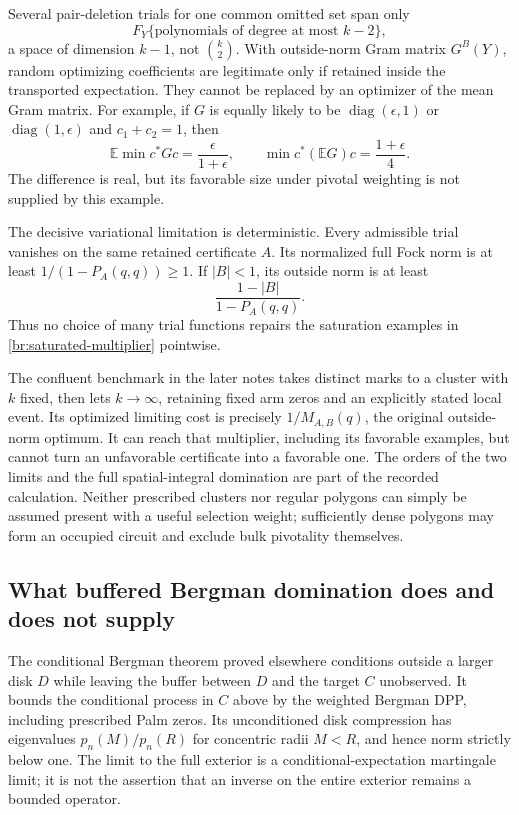 \documentclass[11pt,a4paper]{article}
\theoremstyle{definition}
\theoremstyle{remark}
\numberwithin{equation}{section}
\begin{document}
Several pair-deletion trials for one common omitted set span only
\[
 F_Y\{\text{polynomials of degree at most }k-2\},
\]
a space of dimension $k-1$, not $\binom{k}{2}$.  With outside-norm
Gram matrix $G^B(Y)$, random optimizing coefficients are legitimate
only if retained inside the transported expectation.  They cannot be
replaced by an optimizer of the mean Gram matrix.  For example, if
$G$ is equally likely to be
$\operatorname{diag}(\epsilon,1)$ or
$\operatorname{diag}(1,\epsilon)$ and $c_1+c_2=1$, then
\[
 \mathbb E\min c^*Gc=\frac{\epsilon}{1+\epsilon},
 \qquad
 \min c^*(\mathbb EG)c=\frac{1+\epsilon}{4}.
\]
The difference is real, but its favorable size under pivotal weighting
is not supplied by this example.

The decisive variational limitation is deterministic.  Every admissible
trial vanishes on the same retained certificate $A$.  Its normalized
full Fock norm is at least $1/(1-P_A(q,q))\geq1$.  If $|B|<1$, its
outside norm is at least
\[
 \frac{1-|B|}{1-P_A(q,q)}.
\]
Thus no choice of many trial functions repairs the saturation examples
in \eqref{br:saturated-multiplier} pointwise.

The confluent benchmark in the later notes takes distinct marks to a
cluster with $k$ fixed, then lets $k\to\infty$, retaining fixed arm
zeros and an explicitly stated local event.  Its optimized limiting
cost is precisely $1/M_{A,B}(q)$, the original outside-norm optimum.
It can reach that multiplier, including its favorable examples, but
cannot turn an unfavorable certificate into a favorable one.  The
orders of the two limits and the full spatial-integral domination
are part of the recorded calculation.  Neither prescribed clusters
nor regular polygons can simply be assumed present with a useful
selection weight; sufficiently dense polygons may form an occupied
circuit and exclude bulk pivotality themselves.

\subsection{What buffered Bergman domination does and does not supply}
\label{br:bergman-scope}

The conditional Bergman theorem proved elsewhere conditions outside a
larger disk $D$ while leaving the buffer between $D$ and the target $C$
unobserved.  It bounds the conditional process in $C$ above by the
weighted Bergman DPP, including prescribed Palm zeros.  Its unconditioned
disk compression has eigenvalues
$p_n(M)/p_n(R)$ for concentric radii $M<R$, and hence norm strictly
below one.  The limit to the full exterior is a conditional-expectation
martingale limit; it is not the assertion that an inverse on the
entire exterior remains a bounded operator.
\end{document}

